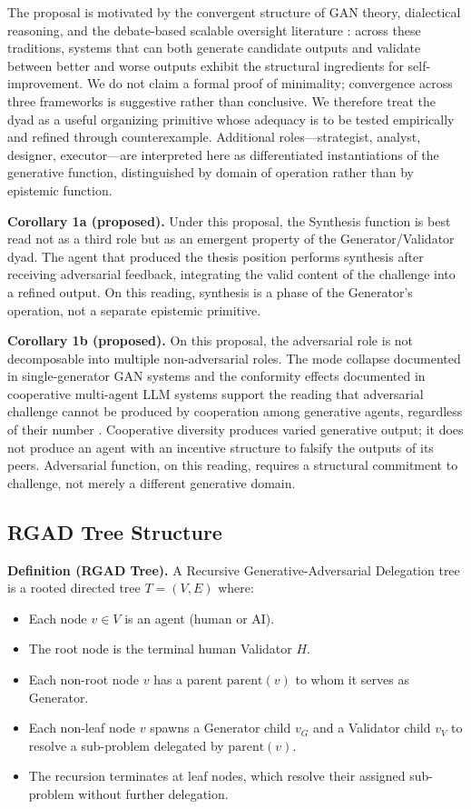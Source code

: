 \documentclass[11pt,a4paper]{article}
\begin{document}
The proposal is motivated by the convergent structure of GAN theory, dialectical reasoning, and the debate-based scalable oversight literature \citep{goodfellow2014, irving2018}: across these traditions, systems that can both generate candidate outputs and validate between better and worse outputs exhibit the structural ingredients for self-improvement. We do not claim a formal proof of minimality; convergence across three frameworks is suggestive rather than conclusive. We therefore treat the dyad as a useful organizing primitive whose adequacy is to be tested empirically and refined through counterexample. Additional roles---strategist, analyst, designer, executor---are interpreted here as differentiated instantiations of the generative function, distinguished by domain of operation rather than by epistemic function.

\textbf{Corollary 1a (proposed).} Under this proposal, the Synthesis function is best read not as a third role but as an emergent property of the Generator/Validator dyad. The agent that produced the thesis position performs synthesis after receiving adversarial feedback, integrating the valid content of the challenge into a refined output. On this reading, synthesis is a phase of the Generator's operation, not a separate epistemic primitive.

\textbf{Corollary 1b (proposed).} On this proposal, the adversarial role is not decomposable into multiple non-adversarial roles. The mode collapse documented in single-generator GAN systems and the conformity effects documented in cooperative multi-agent LLM systems support the reading that adversarial challenge cannot be produced by cooperation among generative agents, regardless of their number \citep{ghosh2018}. Cooperative diversity produces varied generative output; it does not produce an agent with an incentive structure to falsify the outputs of its peers. Adversarial function, on this reading, requires a structural commitment to challenge, not merely a different generative domain.

\subsection{RGAD Tree Structure}
\textbf{Definition (RGAD Tree).} A Recursive Generative-Adversarial Delegation tree is a rooted directed tree $T = (V,E)$ where:
\begin{itemize}
  \item Each node $v \in V$ is an agent (human or AI).
  \item The root node is the terminal human Validator $H$.
  \item Each non-root node $v$ has a parent $\mathrm{parent}(v)$ to whom it serves as Generator.
  \item Each non-leaf node $v$ spawns a Generator child $v_G$ and a Validator child $v_V$ to resolve a sub-problem delegated by $\mathrm{parent}(v)$.
  \item The recursion terminates at leaf nodes, which resolve their assigned sub-problem without further delegation.
\end{itemize}
\end{document}
